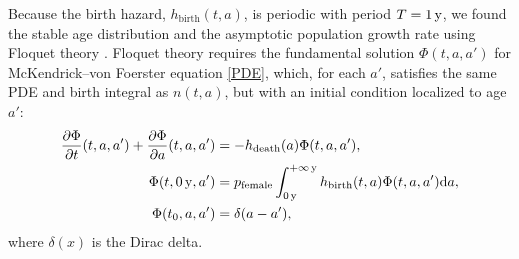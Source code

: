 \documentclass[12pt, USenglish]{article}  %
\newcommand{\md}{\mathrm{d}}
\begin{document}
Because the birth hazard, $h_{\text{birth}}(t, a)$,
is periodic with period $T = \unit[1]{y}$,
we found the stable age distribution and the asymptotic population
growth rate using Floquet theory \autocite{parker_1992}.  Floquet
theory requires the fundamental solution $\Phi(t, a, a')$
for McKendrick--von Foerster equation \eqref{PDE}, which, for each
$a'$,
satisfies the same PDE and birth integral as $n(t, a)$,
but with an initial condition localized to age $a'$:
\begin{equation}
  \label{fundamental_PDE}
  \begin{split}
    \frac{\partial \Phi}{\partial t}(t, a, a')
    + \frac{\partial \Phi}{\partial a}(t, a, a')
    &= - h_{\text{death}}(a) \Phi(t, a, a'),
    \\
    \Phi(t, \unit[0]{y}, a') &=
    p_{\text{female}}
    \int_{\unit[0]{y}}^{\unit[+\infty]{y}}
    h_{\text{birth}}(t, a) \Phi(t, a, a') \md a,
    \\
    \Phi(t_0, a, a') &= \delta(a - a'),
  \end{split}
\end{equation}
where $\delta(x)$ is the Dirac delta.
\end{document}
